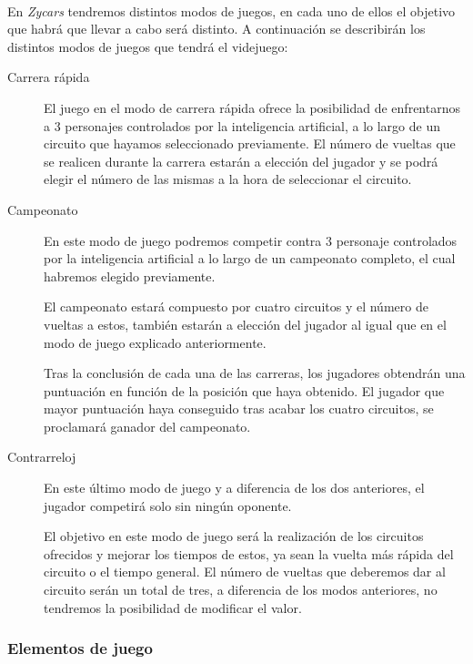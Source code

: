 \documentclass[a4paper,11pt]{article} %
\begin{document}
\paragraph{}
En \emph{Zycars} tendremos distintos modos de juegos, en cada uno de ellos el
objetivo que habrá que llevar a cabo será distinto.
A continuación se describirán los distintos modos de juegos que tendrá el videjuego:

\begin{description}

\item[Carrera rápida]
El juego en el modo de carrera rápida ofrece la posibilidad de enfrentarnos a 3 personajes 
controlados por la inteligencia artificial, a lo largo de un circuito que
hayamos seleccionado previamente. El número de vueltas
que se realicen durante la carrera estarán a elección del jugador y se podrá elegir el número de las mismas a la hora de seleccionar
el circuito.

\item[Campeonato]
En este modo de juego podremos competir contra 3 personaje controlados por la inteligencia artificial 
a lo largo de un campeonato completo, el cual habremos elegido previamente. 

El campeonato estará compuesto por cuatro circuitos y el número de vueltas a estos, también estarán a elección del jugador 
al igual que en el modo de juego explicado anteriormente.

Tras la conclusión de cada una de las carreras, los jugadores obtendrán una puntuación en función de la posición que haya 
obtenido. El jugador que mayor puntuación haya conseguido tras acabar los cuatro circuitos, se proclamará ganador del 
campeonato.

\item[Contrarreloj]
En este último modo de juego y a diferencia de los dos anteriores, el jugador competirá solo sin ningún oponente.

El objetivo en este modo de juego será la realización de los circuitos ofrecidos y mejorar los tiempos de estos, ya sean la 
vuelta más rápida del circuito o el tiempo general. El número de vueltas que deberemos dar al circuito serán un total de tres, a
diferencia de los modos anteriores, no tendremos la posibilidad de modificar el valor.

\end{description}


\subsubsection{Elementos de juego}
\end{document}
